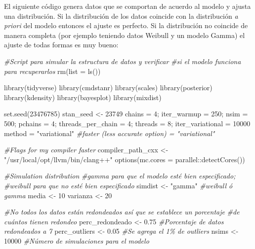 \documentclass[
]{article}
\newenvironment{Shaded}{\begin{snugshade}}{\end{snugshade}}
\newcommand{\AttributeTok}[1]{\textcolor[rgb]{0.77,0.63,0.00}{#1}}
\newcommand{\CommentTok}[1]{\textcolor[rgb]{0.56,0.35,0.01}{\textit{#1}}}
\newcommand{\DecValTok}[1]{\textcolor[rgb]{0.00,0.00,0.81}{#1}}
\newcommand{\FloatTok}[1]{\textcolor[rgb]{0.00,0.00,0.81}{#1}}
\newcommand{\FunctionTok}[1]{\textcolor[rgb]{0.00,0.00,0.00}{#1}}
\newcommand{\NormalTok}[1]{#1}
\newcommand{\OtherTok}[1]{\textcolor[rgb]{0.56,0.35,0.01}{#1}}
\newcommand{\SpecialCharTok}[1]{\textcolor[rgb]{0.00,0.00,0.00}{#1}}
\newcommand{\StringTok}[1]{\textcolor[rgb]{0.31,0.60,0.02}{#1}}
\begin{document}
El siguiente código genera datos que se comportan de acuerdo al modelo y
ajusta una distribución. Si la distribución de los datos coincide con la
distribución \emph{a priori} del modelo entonces el ajuste es perfecto.
Si la distribución no coincide de manera completa (por ejemplo teniendo
datos Weibull y un modelo Gamma) el ajuste de todas formas es muy bueno:

\begin{Shaded}
\begin{Highlighting}[]
\CommentTok{\#Script para simular la estructura de datos y verificar}
\CommentTok{\#si el modelo funciona para recuperarlos}
\FunctionTok{rm}\NormalTok{(}\AttributeTok{list =} \FunctionTok{ls}\NormalTok{())}

\FunctionTok{library}\NormalTok{(tidyverse)}
\FunctionTok{library}\NormalTok{(cmdstanr)}
\FunctionTok{library}\NormalTok{(scales)}
\FunctionTok{library}\NormalTok{(posterior)}
\FunctionTok{library}\NormalTok{(kdensity)}
\FunctionTok{library}\NormalTok{(bayesplot)}
\FunctionTok{library}\NormalTok{(mixdist)}

\FunctionTok{set.seed}\NormalTok{(}\DecValTok{23476785}\NormalTok{)}
\NormalTok{stan\_seed }\OtherTok{\textless{}{-}} \DecValTok{23749}
\NormalTok{chains }\OtherTok{=} \DecValTok{4}\NormalTok{; iter\_warmup }\OtherTok{=} \DecValTok{250}\NormalTok{; nsim }\OtherTok{=} \DecValTok{500}\NormalTok{; pchains }\OtherTok{=} \DecValTok{4}\NormalTok{; }
\NormalTok{threads\_per\_chain }\OtherTok{=} \DecValTok{4}\NormalTok{; threads }\OtherTok{=} \DecValTok{8}\NormalTok{; iter\_variational }\OtherTok{=} \DecValTok{10000}
\NormalTok{method }\OtherTok{=} \StringTok{"variational"} \CommentTok{\#faster (less accurate option) = "variational"}

\CommentTok{\#Flags for my compiler faster}
\NormalTok{compiler\_path\_cxx }\OtherTok{\textless{}{-}} \StringTok{"/usr/local/opt/llvm/bin/clang++"}
\FunctionTok{options}\NormalTok{(}\AttributeTok{mc.cores =}\NormalTok{ parallel}\SpecialCharTok{::}\FunctionTok{detectCores}\NormalTok{())}

\CommentTok{\#Simulation distribution}
\CommentTok{\#gamma para que el modelo esté bien especificado;}
\CommentTok{\#weibull para que no esté bien especificado}
\NormalTok{simdist }\OtherTok{\textless{}{-}} \StringTok{"gamma"} \CommentTok{\#weibull ó gamma}
\NormalTok{media    }\OtherTok{\textless{}{-}} \DecValTok{10}
\NormalTok{varianza }\OtherTok{\textless{}{-}} \DecValTok{20}

\CommentTok{\#No todos los datos están redondeados así que se establece un porcentaje}
\CommentTok{\#de cuántos tienen redondeo}
\NormalTok{perc\_redondeado }\OtherTok{\textless{}{-}} \FloatTok{0.75}  \CommentTok{\#Porcentaje de datos redondeados a 7}
\NormalTok{perc\_outliers   }\OtherTok{\textless{}{-}} \FloatTok{0.05}  \CommentTok{\#Se agrega el 1\% de outliers}
\NormalTok{nsims           }\OtherTok{\textless{}{-}} \DecValTok{10000} \CommentTok{\#Número de simulaciones para el modelo}


\end{Highlighting}
\end{Shaded}
\end{document}

